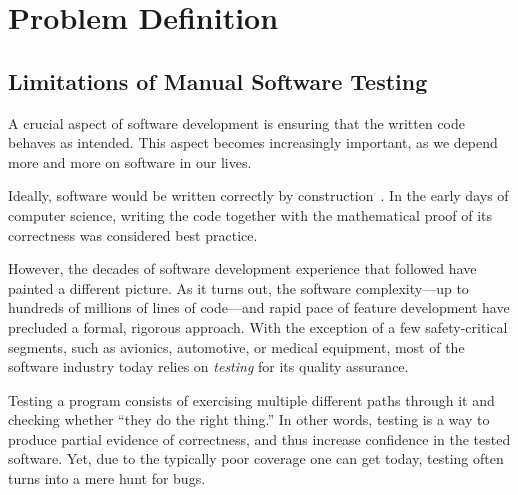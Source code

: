 \section{Problem Definition}

\subsection{Limitations of Manual Software Testing}


A crucial aspect of software development is ensuring that the written code behaves as intended.  This aspect becomes increasingly important, as we depend more and more on software in our lives.


Ideally, software would be written correctly by construction~\cite{dijkstra1976discipline}.  In the early days of computer science, writing the code together with the mathematical proof of its correctness was considered best practice.

However, the decades of software development experience that followed have painted a different picture.  As it turns out, the software complexity---up to hundreds of millions of lines of code---and rapid pace of feature development have precluded a formal, rigorous approach.
%
With the exception of a few safety-critical segments, such as avionics, automotive, or medical equipment, most of the software industry today relies on \emph{testing} for its quality assurance.


Testing a program consists of exercising multiple different paths through it and checking whether ``they do the right thing.''  In other words, testing is a way to produce partial evidence of correctness, and thus increase confidence in the tested software.  Yet, due to the typically poor coverage one can get today, testing often turns into a mere hunt for bugs.

